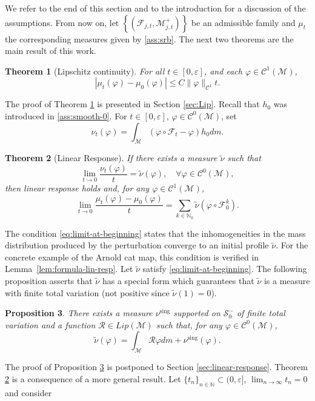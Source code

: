 \documentclass{amsart}
\numberwithin{equation}{section}
\newtheorem{theorem}{Theorem}[section]
\newtheorem{proposition}[theorem]{Proposition}
\newcommand\ve{\varepsilon}
\newcommand\vf{\varphi}
\renewcommand{\le}{\leqslant}
\renewcommand{\tilde}{\widetilde}
\newcommand\cC{{\mathcal C}}
\newcommand\cF{{\mathcal F}}
\newcommand\cM{{\mathcal M}}
\newcommand\cS{{\mathcal S}}
\newcommand\bN{{\mathbb N}}
\newcommand{\sing}{\nu^{\text{sing}}}
\begin{document}
We refer to the end of this section and to the introduction for a discussion of the assumptions. From now on, let \(\left\{(\cF_{j,t}, \cM_{j,t}^+)\right\}\) be an admissible family and \(\mu_t\) the corresponding measures given by \ref{ass:srb}. The next two theorems are the main result of this work.
\begin{theorem}[Lipschitz continuity]\label{thm:Lip}
 For all \(t \in  [0, \ve]\), and each \(\vf \in \cC^1(\cM)\),
  \[
    \left| \mu_t(\vf) - \mu_0(\vf) \right| \le C\|\vf\|_{\cC^1} t.
  \]
\end{theorem}
The proof of Theorem \ref{thm:Lip} is presented in Section \ref{sec:Lip}. Recall that \(h_0\) was introduced in \ref{ass:smooth-0}. For \(t \in [0,\ve]\), \(\vf \in \cC^0(\cM)\), set
\[
   \nu_t (\vf) = \int_{\cM} \left(\vf \circ \cF_t - \vf\right) h_0dm.
\]
\begin{theorem}[Linear Response] \label{thm:linear-resp}
 If there exists a measure \(\widetilde \nu\) such that
\begin{equation}\label{eq:limit-at-beginning}
  \lim_{t \to 0} \frac{\nu_t (\vf) }{t} = \widetilde \nu(\vf), \quad \forall \vf \in \cC^0(\cM),
 \end{equation}
then linear response holds and, for any \(\vf \in \cC^1(\cM)\),
\[
\lim_{t \to 0} \frac{\mu_t(\vf) - \mu_0(\vf)}{t} = \sum_{k \in \bN_0} \widetilde\nu \left(\vf \circ \cF_0^k\right).
\]
\end{theorem}
The condition \eqref{eq:limit-at-beginning} states that the inhomogeneities in the mass distribution produced by the perturbation converge to an initial profile \(\tilde \nu\). For the concrete example of the Arnold cat map, this condition is verified in Lemma~\ref{lem:formula-lin-resp}. Let \(\widetilde \nu\) satisfy \eqref{eq:limit-at-beginning}. The following proposition asserts that \(\widetilde \nu\) has a special form which guarantees that \(\tilde \nu\) is a measure with finite total variation (not positive since \(\tilde \nu (1) =0\)).
\begin{proposition}\label{prop:form-measure}
There exists a measure \(\sing\) supported on \(\cS^{-}_0\) of finite total variation and a function \(\mathcal R \in Lip(\cM)\) such that, for any \(\vf \in \cC^0(\cM)\),
\[
  \widetilde \nu(\vf) = \int_{\cM}\mathcal R \vf dm + \sing(\vf).
\]
\end{proposition}
The proof of Proposition \ref{prop:form-measure} is postponed to Section \ref{sec:linear-response}. Theorem \ref{thm:linear-resp} is a consequence of a more general result. Let \(\{t_n\}_{n \in \bN} \subset (0,\ve]\), \(\lim_{n \to \infty}t_n = 0\) and consider
\end{document}
